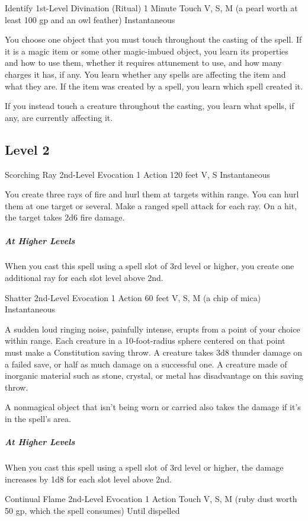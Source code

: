{\DndSpellHeader
  {Identify}
  {1st-Level Divination (Ritual)}
  {1 Minute}
  {Touch}
  {V, S, M (a pearl worth at least 100 gp and an owl feather)}
  {Instantaneous}

You choose one object that you must touch throughout the casting of the spell. If it is a magic item or some other magic-imbued object, you learn its properties and how to use them, whether it requires attunement to use, and how many charges it has, if any. You learn whether any spells are affecting the item and what they are. If the item was created by a spell, you learn which spell created it.

If you instead touch a creature throughout the casting, you learn what spells, if any, are currently affecting it.

\subsection*{Level 2}

\DndSpellHeader
  {Scorching Ray}
  {2nd-Level Evocation}
  {1 Action}
  {120 feet}
  {V, S}
  {Instantaneous}

You create three rays of fire and hurl them at targets within range. You can hurl them at one target or several. Make a ranged spell attack for each ray. On a hit, the target takes 2d6 fire damage.

\subparagraph*{At Higher Levels} When you cast this spell using a spell slot of 3rd level or higher, you create one additional ray for each slot level above 2nd.

\DndSpellHeader
  {Shatter}
  {2nd-Level Evocation}
  {1 Action}
  {60 feet}
  {V, S, M (a chip of mica)}
  {Instantaneous}

A sudden loud ringing noise, painfully intense, erupts from a point of your choice within range. Each creature in a 10-foot-radius sphere centered on that point must make a Constitution saving throw. A creature takes 3d8 thunder damage on a failed save, or half as much damage on a successful one. A creature made of inorganic material such as stone, crystal, or metal has disadvantage on this saving throw.

A nonmagical object that isn’t being worn or carried also takes the damage if it’s in the spell’s area.

\subparagraph*{At Higher Levels} When you cast this spell using a spell slot of 3rd level or higher, the damage increases by 1d8 for each slot level above 2nd.

\DndSpellHeader
  {Continual Flame}
  {2nd-Level Evocation}
  {1 Action}
  {Touch}
  {V, S, M (ruby dust worth 50 gp, which the spell consumes)}
  {Until dispelled}

}
